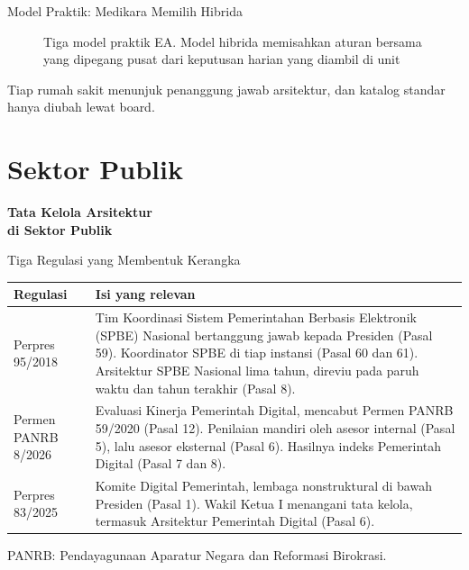 \documentclass[aspectratio=169, table, 12pt]{beamer}
\begin{document}
\begin{frame}{{\Large Model Praktik: Medikara Memilih Hibrida}}
  \centering
  \begin{figure}
    \resizebox{0.70\textwidth}{!}{}
    \caption{Tiga model praktik EA. Model hibrida memisahkan aturan bersama yang dipegang pusat dari
             keputusan harian yang diambil di unit}
  \end{figure}
  \vspace{-6pt}
  \small Tiap rumah sakit menunjuk penanggung jawab arsitektur, dan katalog standar hanya diubah lewat
  board.
\end{frame}

\section{Sektor Publik}

\begin{frame}{\hfill}
  \centering
  \Huge{\textbf{Tata Kelola Arsitektur\\di Sektor Publik}}
\end{frame}

\begin{frame}{{\Large Tiga Regulasi yang Membentuk Kerangka}}
  \scriptsize
  \begin{tabularx}{\textwidth}{L{2.8cm}Y}
    \hline
    \textbf{Regulasi} & \textbf{Isi yang relevan} \\
    \hline
    Perpres 95/2018 & Tim Koordinasi Sistem Pemerintahan Berbasis Elektronik (SPBE) Nasional bertanggung
      jawab kepada Presiden (Pasal 59). Koordinator SPBE di tiap instansi (Pasal 60 dan 61). Arsitektur
      SPBE Nasional lima tahun, direviu pada paruh waktu dan tahun terakhir (Pasal 8). \\
    \hline
    Permen PANRB 8/2026 & Evaluasi Kinerja Pemerintah Digital, mencabut Permen PANRB 59/2020 (Pasal 12).
      Penilaian mandiri oleh asesor internal (Pasal 5), lalu asesor eksternal (Pasal 6). Hasilnya indeks
      Pemerintah Digital (Pasal 7 dan 8). \\
    \hline
    Perpres 83/2025 & Komite Digital Pemerintah, lembaga nonstruktural di bawah Presiden (Pasal 1).
      Wakil Ketua I menangani tata kelola, termasuk Arsitektur Pemerintah Digital (Pasal 6). \\
    \hline
  \end{tabularx}

  \vspace{6pt}
  \small PANRB: Pendayagunaan Aparatur Negara dan Reformasi Birokrasi.
\end{frame}
\end{document}
